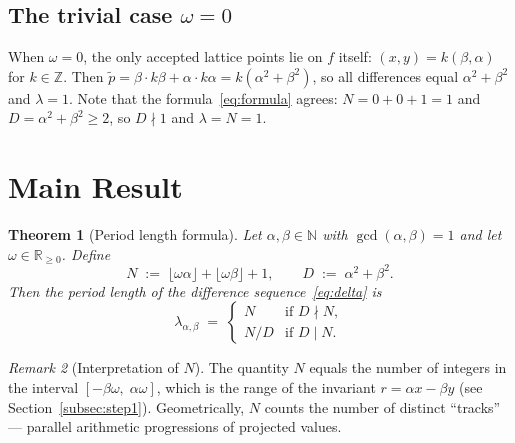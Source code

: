 \documentclass[11pt]{article}
\theoremstyle{plain}
\newtheorem{theorem}{Theorem}[section]
\theoremstyle{definition}
\theoremstyle{remark}
\newtheorem{remark}[theorem]{Remark}
\begin{document}
\subsection{The trivial case $\omega = 0$}\label{subsec:omega0}

When $\omega = 0$, the only accepted lattice points lie on $f$ itself:
$(x, y) = k(\beta, \alpha)$ for $k \in \mathbb{Z}$.
Then $\tilde{p} = \beta \cdot k\beta + \alpha \cdot k\alpha
= k(\alpha^2+\beta^2)$, so all differences equal $\alpha^2+\beta^2$ and
$\lambda = 1$.
Note that the formula~\eqref{eq:formula} agrees: $N = 0 + 0 + 1 = 1$
and $D = \alpha^2+\beta^2 \ge 2$, so $D \nmid 1$ and $\lambda = N = 1$.

\section{Main Result}\label{sec:mainresult}

\begin{theorem}[Period length formula]\label{thm:main}
Let $\alpha, \beta \in \mathbb{N}$ with $\gcd(\alpha, \beta) = 1$ and let
$\omega \in \mathbb{R}_{\ge 0}$.  Define
\begin{equation}\label{eq:ND}
    N \;:=\; \lfloor\omega\alpha\rfloor + \lfloor\omega\beta\rfloor + 1,
    \qquad
    D \;:=\; \alpha^2 + \beta^2.
\end{equation}
Then the period length of the difference sequence~\eqref{eq:delta} is
\begin{equation}\label{eq:formula}
    \lambda_{\alpha,\beta} \;=\;
    \begin{cases}
        N & \text{if } D \nmid N, \\[3pt]
        N / D & \text{if } D \mid N.
    \end{cases}
\end{equation}
\end{theorem}

\begin{remark}[Interpretation of $N$]\label{rem:N}
The quantity $N$ equals the number of integers in the interval
$[-\beta\omega,\; \alpha\omega]$, which is the range of the invariant
$r = \alpha x - \beta y$ (see Section~\ref{subsec:step1}).
Geometrically, $N$ counts the number of distinct ``tracks'' --- parallel
arithmetic progressions of projected values.
\end{remark}
\end{document}
